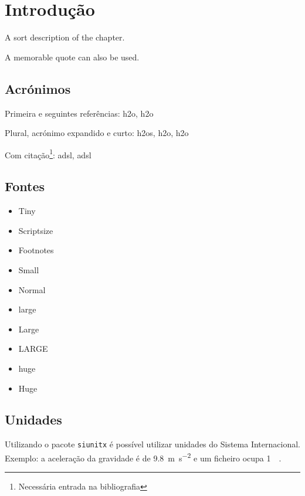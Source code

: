 

\chapter{Introdução}
\label{chapter:introduction}

\begin{introduction}
A sort description of the chapter.

A memorable quote can also be used.
\end{introduction}



\section{Acrónimos}

Primeira e seguintes referências: \ac{h2o}, \ac{h2o}

Plural, acrónimo expandido e curto: \acp{h2o}, \acs{h2o}, \acl{h2o}

Com citação\footnote{Necessária entrada na bibliografia}: \ac{adsl}, \ac{adsl}


\section{Fontes}

\begin{itemize}
\item{\tiny Tiny}
\item{\scriptsize Scriptsize}
\item{\footnotesize Footnotes}
\item{\small Small}
\item{\normalsize Normal}
\item{\large large}
\item{\Large Large}
\item{\LARGE LARGE}
\item{\huge huge}
\item{\Huge Huge}
\end{itemize}

\section{Unidades}

Utilizando o pacote \verb|siunitx| é possível utilizar unidades do Sistema Internacional. Exemplo: a aceleração da gravidade é de \SI{9.8}{\metre\per\second\squared} e um ficheiro ocupa \SI{1}{\mebi\byte}. 

